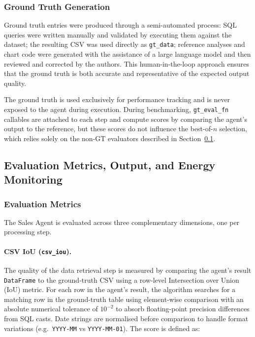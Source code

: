 \documentclass[11pt,a4paper]{article}
\begin{document}
\subsubsection{Ground Truth Generation}

Ground truth entries were produced through a semi-automated process: SQL queries
were written manually and validated by executing them against the dataset; the
resulting CSV was used directly as \texttt{gt\_data}; reference analyses and chart
code were generated with the assistance of a large language model and then reviewed
and corrected by the authors. This human-in-the-loop approach ensures that the
ground truth is both accurate and representative of the expected output quality.

The ground truth is used exclusively for performance tracking and is never exposed
to the agent during execution. During benchmarking, \texttt{gt\_eval\_fn} callables
are attached to each step and compute scores by comparing the agent's output to the
reference, but these scores do not influence the best-of-$n$ selection, which relies
solely on the non-GT evaluators described in Section~\ref{subsec:evaluation}.

\subsection{Evaluation Metrics, Output, and Energy Monitoring}
\label{subsec:evaluation}

\subsubsection{Evaluation Metrics}

The Sales Agent is evaluated across three complementary dimensions, one per
processing step.

\paragraph{CSV IoU (\texttt{csv\_iou}).}
The quality of the data retrieval step is measured by comparing the agent's result
\texttt{DataFrame} to the ground-truth CSV using a row-level Intersection over
Union (IoU) metric. For each row in the agent's result, the algorithm searches for
a matching row in the ground-truth table using element-wise comparison with an
absolute numerical tolerance of $10^{-2}$ to absorb floating-point precision
differences from SQL casts. Date strings are normalised before comparison to handle
format variations (e.g.\ \texttt{YYYY-MM} vs \texttt{YYYY-MM-01}). The score is
defined as:
\end{document}
